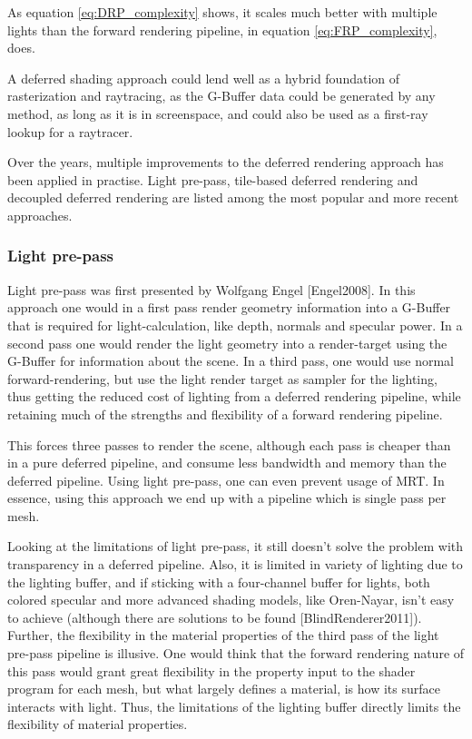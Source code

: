 As equation \eqref{eq:DRP_complexity} shows, it scales much better with multiple lights than the forward rendering pipeline, in equation \eqref{eq:FRP_complexity}, does.

A deferred shading approach could lend well as a hybrid foundation of rasterization and raytracing, as the G-Buffer data could be generated by any method, as long as it is in screenspace, and could also be used as a first-ray lookup for a raytracer.

Over the years, multiple improvements to the deferred rendering approach has been applied in practise. Light pre-pass, tile-based deferred rendering and decoupled deferred rendering are listed among the most popular and more recent approaches.

\subsubsection{Light pre-pass}

Light pre-pass was first presented by Wolfgang Engel [Engel2008]. In this approach one would in a first pass render geometry information into a G-Buffer that is required for light-calculation, like depth, normals and specular power. In a second pass one would render the light geometry into a render-target using the G-Buffer for information about the scene. In a third pass, one would use normal forward-rendering, but use the light render target as sampler for the lighting, thus getting the reduced cost of lighting from a deferred rendering pipeline, while retaining much of the strengths and flexibility of a forward rendering pipeline. 

This forces three passes to render the scene, although each pass is cheaper than in a pure deferred pipeline, and consume less bandwidth and memory than the deferred pipeline. Using light pre-pass, one can even prevent usage of MRT. In essence, using this approach we end up with a pipeline which is single pass per mesh.

Looking at the limitations of light pre-pass, it still doesn't solve the problem with transparency in a deferred pipeline. Also, it is limited in variety of lighting due to the lighting buffer, and if sticking with a four-channel buffer for lights, both colored specular and more advanced shading models, like Oren-Nayar, isn't easy to achieve (although there are solutions to be found [BlindRenderer2011]). Further, the flexibility in the material properties of the third pass of the light pre-pass pipeline is illusive. One would think that the forward rendering nature of this pass would grant great flexibility in the property input to the shader program for each mesh, but what largely defines a material, is how its surface interacts with light. Thus, the limitations of the lighting buffer directly limits the flexibility of material properties.

